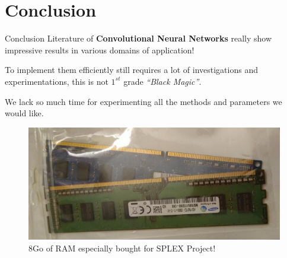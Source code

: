 \section{Conclusion} 
    \begin{frame}[c]{Conclusion}
    Literature of \textbf{Convolutional Neural Networks} really show impressive results in various domains of application!
    
    To implement them efficiently still requires a lot of investigations and experimentations, this is not $1^{st}$ grade \emph{``Black Magic''}.

    We lack so much time for experimenting all the methods and parameters we would like.
    \begin{figure}
        \centering
        \includegraphics[width=0.8\linewidth]{RAM.jpeg}
        \caption{8Go of RAM especially bought for SPLEX Project!}
    \end{figure}
\end{frame}